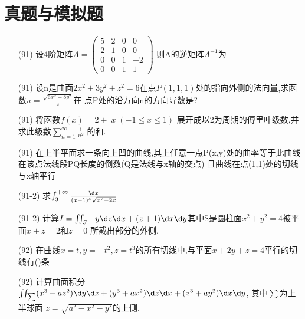 \documentclass[12pt, a4paper, oneside, UTF8]{ctexbook}
\begin{document}
% 
\else
\fi
\chapter{真题与模拟题}

\begin{enumerate}
    \item [(91)]设4阶矩阵$A=\begin{pmatrix}
    5 & 2 & 0 & 0 \\
    2 & 1 & 0 & 0 \\
    0 & 0 & 1 & -2 \\
    0 & 0 & 1 & 1
    \end{pmatrix}$ 则A的逆矩阵$A^{-1}$为

    \item [(91)]设n是曲面$2x^2+3y^2+z^2=6$在点$P(1,1,1)$处的指向外侧的法向量,求函数$u=\frac{\sqrt{6x^2+8y^2}}{z}$在
    点P处的沿方向n的方向导数是?

    \item[(91)] \bl 将函数$f(x)=2+\left|x\right|(-1\leq x\leq 1)$ 展开成以2为周期的傅里叶级数,并求此级数$\sum_{n=1}^{\infty}\frac{1}{n^2}$
    的和. 

    \item[(91)] \bl 在上半平面求一条向上凹的曲线,其上任意一点P(x,y)处的曲率等于此曲线在该点法线段PQ长度的倒数(Q是法线与x轴的交点)
    且曲线在点(1,1)处的切线与x轴平行 

    \item[(91-2)] \bl 求$\int_{3}^{+\infty}\frac{\d x}{(x-1)^4\sqrt{x^2-2x}}$
    \item[(91-2)] \bt 计算$I=\iint_{S}-y\d z\d x + (z+1)\d x\d y$其中S是圆柱面$x^2+y^2=4$被平面$x+z=2$和$z=0$ 
    所截出部分的外侧.

    \item[(92)] 在曲线$x=t, y = -t^2, z = t^3$的所有切线中,与平面$x+2y+z=4$平行的切线有(\qquad)条
    \item[(92)] 计算曲面积分$\iint_{\sum}(x^3+az^2)\d y\d z + (y^3 + ax^2)\d z\d x + (z^3 + ay^2)\d x\d y$, 其中$\sum$为上半球面
    $z=\sqrt{a^2 - x^2 - y^2}$的上侧. 


\end{enumerate}
\end{document}
